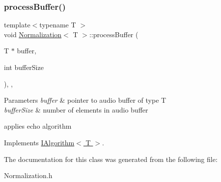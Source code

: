 \subsubsection{\texorpdfstring{process\+Buffer()}{processBuffer()}}
{\footnotesize\ttfamily template$<$typename T $>$ \\
void \hyperlink{classNormalization}{Normalization}$<$ T $>$\+::process\+Buffer (\begin{DoxyParamCaption}\item[{T $\ast$}]{buffer,  }\item[{int}]{buffer\+Size }\end{DoxyParamCaption})\hspace{0.3cm}{\ttfamily [inline]}, {\ttfamily [override]}, {\ttfamily [virtual]}}


\begin{DoxyParams}{Parameters}
{\em buffer} & pointer to audio buffer of type T \\
\hline
{\em buffer\+Size} & number of elements in audio buffer\\
\hline
\end{DoxyParams}
applies echo algorithm 

Implements \hyperlink{classIAlgorithm}{I\+Algorithm$<$ T $>$}.



The documentation for this class was generated from the following file\+:\begin{DoxyCompactItemize}
\item 
Normalization.\+h\end{DoxyCompactItemize}
